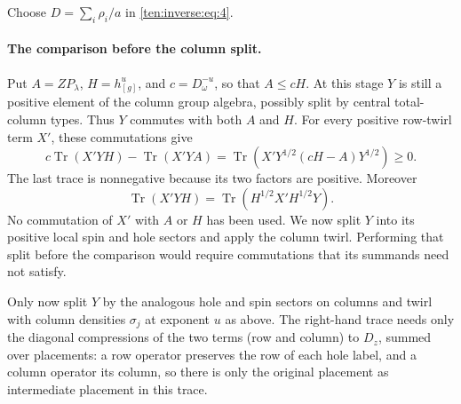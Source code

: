 Choose $D=\sum_i\rho_i/a$ in \eqref{ten:inverse:eq:4}. \paragraph{The comparison before the column split.}
Put $A=ZP_\lambda$, $H=h_{[g]}^u$, and $c=D_\omega^{-u}$, so that
$A\le cH$.  At this stage $Y$ is still a positive element of the column
group algebra, possibly split by central total-column types.  Thus
$Y$ commutes with both $A$ and $H$.  For every positive row-twirl term
$X'$, these commutations give
\[
 c\operatorname{Tr}(X'YH)-\operatorname{Tr}(X'YA)
 =\operatorname{Tr}\!\left(
 X'Y^{1/2}(cH-A)Y^{1/2}\right)\ge0.
\]
The last trace is nonnegative because its two factors are positive.
Moreover
\[
 \operatorname{Tr}(X'YH)=\operatorname{Tr}(H^{1/2}X'H^{1/2}Y).
\]  No commutation of $X'$ with
$A$ or $H$ has been used.  We now split $Y$ into its positive local
spin and hole sectors and apply the column twirl.  Performing that split
before the comparison would require commutations that its summands need
not satisfy.


Only now split \(Y\) by the analogous hole and spin sectors on columns and twirl with column densities \(\sigma_j\) at exponent \(u\) as above. The right-hand trace needs only the diagonal compressions of the two terms (row and column) to \(D_z\), summed over placements: a row operator preserves the row of each hole label, and a column operator its column, so there is only the original placement as intermediate placement in this trace.

